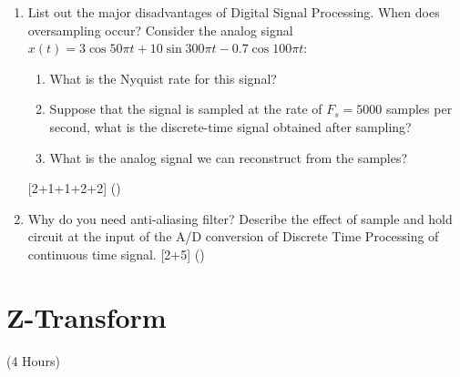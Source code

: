 \documentclass[12pt]{article}
\begin{document}
\begin{enumerate}[topsep=0pt, noitemsep]
      \item List out the major disadvantages of Digital Signal Processing. When does oversampling occur? Consider the analog signal $x(t)=3\cos 50\pi t+10\sin 300\pi t-0.7\cos 100\pi t$:
        \begin{enumerate}[label=(\alph*), noitemsep, topsep=0pt]
          \item What is the Nyquist rate for this signal?
          \item Suppose that the signal is sampled at the rate of $F_s=5000$ samples per second, what is the discrete-time signal obtained after sampling?
          \item What is the analog signal we can reconstruct from the samples?
        \end{enumerate}
        \hfill [2+1+1+2+2] ()

      \item Why do you need anti-aliasing filter? Describe the effect of sample and hold circuit at the input of the A/D conversion of Discrete Time Processing of continuous time signal. \hfill [2+5] ()
    \end{enumerate}

\pagebreak
\section{Z-Transform}
\begin{center}(4 Hours)\end{center}
\end{document}
